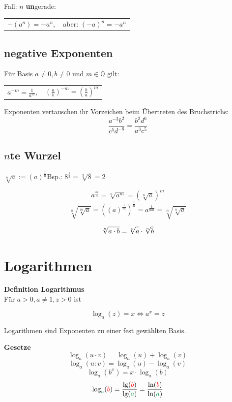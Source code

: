 \begin{multicols}{2}
Fall: $n$ \textbf{un}gerade:

\begin{tabular}{cc}
 $-(a^n) = -a^n,$ & aber: $(-a)^n = -a^n$
 \end{tabular} 


\subsection*{negative Exponenten}

Für Basis $a\ne 0, b\ne 0$ und $m \in\mathbb{Q}$ gilt:

\begin{tabular}{cc}
$a^{-m} = \frac1{a^m},$ & $\left(\frac{a}b\right)^{-m} = \left(\frac{b}a\right)^m$
 \end{tabular}

Exponenten vertauschen ihr Vorzeichen beim Übertreten des Bruchstrichs:
$$\frac{a^{-3}b^2}{c^5d^{-6}} = \frac{b^2d^6}{a^3c^5}$$


\subsection*{$n$te Wurzel}
$\sqrt[n]{a} := \left(a\right)^\frac1n$\hfill{}Bsp.: $8^{\frac13}=\sqrt[3]{8}=2$

$$a^{\frac{m}n} = \sqrt[n]{a^m} = \left(\sqrt[n]a\right)^m$$
$$\sqrt[n]{\sqrt[m]{a}}   = \left((a)^\frac1m \right)^\frac1n = a^\frac1{nm} = \sqrt[m]{\sqrt[n]{a}}  $$

$$\sqrt[n]{a\cdot{}b} = \sqrt[n]{\vphantom{b}a} \cdot \sqrt[n]b$$

 
\forceCB
\section*{Logarithmen}
\begin{tcolorbox}[colback=white]
  \textbf{Definition Logarithmus}\\
  Für $a>0, a\ne 1, z>0$ ist

$$\log_a{}(z)=x \Longleftrightarrow{} a^x = z$$
\end{tcolorbox}

Logarithmen sind Exponenten zu einer fest gewählten Basis.

\begin{tcolorbox}[colback=white]
\textbf{Gesetze}
$$\log_a(u\cdot v) = \log_a(u) + \log_a(v)$$
$$\log_a(u : v) = \log_a(u) - \log_a(v)$$
$$\log_a(b^x) = x\cdot{}\log_a(b)$$
$$\log_{\color{ForestGreen}a}({\color{red}b}) = \frac{\lg({\color{red}b})}{\lg({\color{ForestGreen}a})} = \frac{\ln({\color{red}b})}{\ln({\color{ForestGreen}a})}$$
\end{tcolorbox}




\end{multicols}
